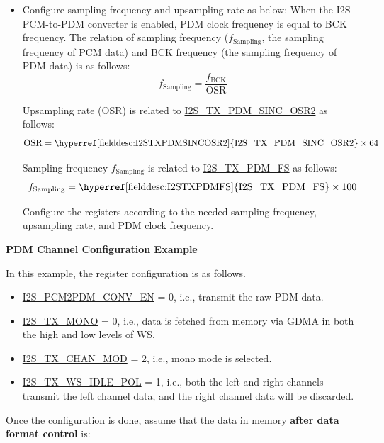 \documentclass[main\_\_EN.tex]{subfiles}
\begin{document}
\begin{itemize}
    \item Configure sampling frequency and upsampling rate as below: \newline
    When the I2S PCM-to-PDM converter is enabled, PDM clock frequency is equal to BCK frequency. The relation of sampling frequency ($f_{\textrm{Sampling}}$, the sampling frequency of PCM data) and BCK frequency (the sampling frequency of PDM data) is as follows:
    $$f_{\textrm{Sampling}} = \frac{f_{\textrm{BCK}}}{\textrm{OSR}}$$
    
    Upsampling rate (OSR) is related to \hyperref[fielddesc:I2STXPDMSINCOSR2]{I2S\_TX\_PDM\_SINC\_OSR2} as follows:
    $${\textrm{OSR}} = {\textrm{\hyperref[fielddesc:I2STXPDMSINCOSR2]{I2S\_TX\_PDM\_SINC\_OSR2}}} \times {\textrm{64}}$$
    
    Sampling frequency $f_{\textrm{Sampling}}$ is related to \hyperref[fielddesc:I2STXPDMFS]{I2S\_TX\_PDM\_FS} as follows:
    $$f_{\textrm{Sampling}} = {\textrm{\hyperref[fielddesc:I2STXPDMFS]{I2S\_TX\_PDM\_FS}}} \times {\textrm{100}}$$

    Configure the registers according to the needed sampling frequency, upsampling rate, and PDM clock frequency.
\end{itemize}

\textbf{PDM Channel Configuration Example}

In this example, the register configuration is as follows.
\begin{itemize}
    \item \hyperref[fielddesc:I2SPCM2PDMCONVEN]{I2S\_PCM2PDM\_CONV\_EN} = 0, i.e., transmit the raw PDM data.
    \item \hyperref[fielddesc:I2STXMONO]{I2S\_TX\_MONO} = 0, i.e., data is fetched from memory via GDMA in both the high and low levels of WS.
    \item \hyperref[fielddesc:I2STXCHANMOD]{I2S\_TX\_CHAN\_MOD} = 2, i.e., mono mode is selected.
    \item \hyperref[fielddesc:I2STXWSIDLEPOL]{I2S\_TX\_WS\_IDLE\_POL} = 1, i.e., both the left and right channels transmit the left channel data, and the right channel data will be discarded.
\end{itemize}

Once the configuration is done, assume that the data in memory \textbf{after data format control} is:
\end{document}
